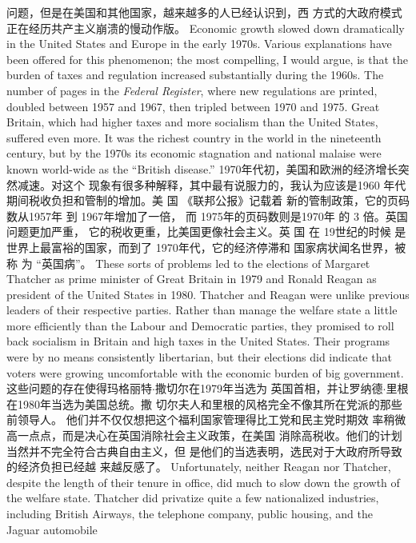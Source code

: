 \begin{paracol}{2}
问题，但是在美国和其他国家，越来越多的人已经认识到，西
方式的大政府模式正在经历共产主义崩溃的慢动作版。
\switchcolumn*
Economic growth slowed down dramatically in the United
States and Europe in the early 1970s. Various explanations have
been offered for this phenomenon; the most compelling, I
would argue, is that the burden of taxes and regulation increased substantially during the 1960s. The number of pages in
the \textit{Federal Register}, where new regulations are printed, doubled
between 1957 and 1967, then tripled between 1970 and 1975.
Great Britain, which had higher taxes and more socialism than
the United States, suffered even more. It was the richest country in the world in the nineteenth century, but by the 1970s its
economic stagnation and national malaise were known world-wide as the ``British disease.''
\switchcolumn
1970年代初，美国和欧洲的经济增长突然减速。对这个
现象有很多种解释，其中最有说服力的，我认为应该是1960
年代期间税收负担和管制的增加。美 国 《联邦公报》记载着
新的管制政策，它的页码数从1957年 到 1967年增加了一倍，
而 1975年的页码数则是1970年 的 3 倍。英国问题更加严重，
它的税收更重，比美国更像社会主义。英 国 在 19世纪的时候
是世界上最富裕的国家，而到了 1970年代，它的经济停滞和
国家病状闻名世界，被 称 为 “英国病”。
\switchcolumn*
These sorts of problems led to the elections of Margaret
Thatcher as prime minister of Great Britain in 1979 and
Ronald Reagan as president of the United States in 1980.
Thatcher and Reagan were unlike previous leaders of their respective parties. Rather than manage the welfare state a little
more efficiently than the Labour and Democratic parties, they promised to roll back socialism in Britain and high taxes in the
United States. Their programs were by no means consistently
libertarian, but their elections did indicate that voters were
growing uncomfortable with the economic burden of big government.
\switchcolumn
这些问题的存在使得玛格丽特$\cdot$撒切尔在1979年当选为
英国首相，并让罗纳德$\cdot$里根 在1980年当选为美国总统。撒
切尔夫人和里根的风格完全不像其所在党派的那些前领导人。
他们并不仅仅想把这个福利国家管理得比工党和民主党时期效
率稍微高一点点，而是决心在英国消除社会主义政策，在美国
消除高税收。他们的计划当然并不完全符合古典自由主义，但
是他们的当选表明，选民对于大政府所导致的经济负担已经越
来越反感了。
\switchcolumn*
Unfortunately, neither Reagan nor Thatcher, despite the
length of their tenure in office, did much to slow down the
growth of the welfare state. Thatcher did privatize quite a few
nationalized industries, including British Airways, the telephone company, public housing, and the Jaguar automobile

\end{paracol}
